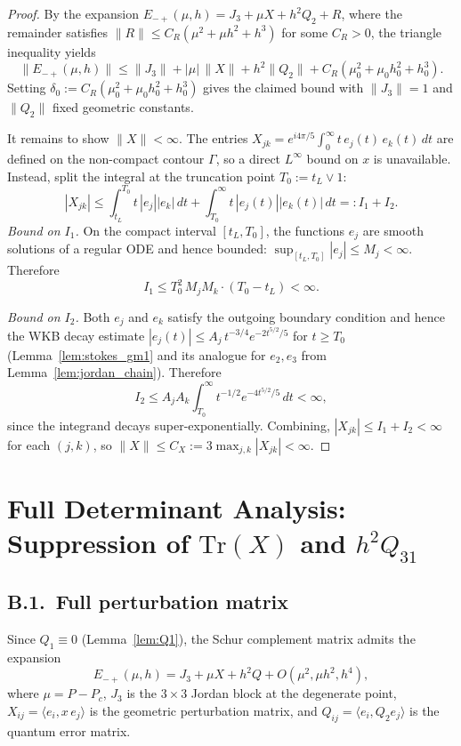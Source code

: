 \documentclass[12pt,a4paper]{amsart}
\theoremstyle{remark}
\begin{document}
\begin{proof}
By the expansion $E_{-+}(\mu,h) = J_3 + \mu X + h^2 Q_2 + R$, where the remainder
satisfies $\|R\| \leq C_R(\mu^2 + \mu h^2 + h^3)$ for some $C_R > 0$, the triangle
inequality yields
\[
  \|E_{-+}(\mu,h)\| \leq \|J_3\| + |\mu|\,\|X\| + h^2\|Q_2\| + C_R(\mu_0^2 + \mu_0 h_0^2 + h_0^3).
\]
Setting $\delta_0 := C_R(\mu_0^2 + \mu_0 h_0^2 + h_0^3)$ gives the claimed bound with
$\|J_3\| = 1$ and $\|Q_2\|$ fixed geometric constants.

It remains to show $\|X\| < \infty$.
The entries $X_{jk} = e^{i4\pi/5}\int_0^\infty t\,e_j(t)\,e_k(t)\,dt$
are defined on the non-compact contour $\Gamma$, so a direct $L^\infty$ bound on $x$
is unavailable.
Instead, split the integral at the truncation point $T_0 := t_L \vee 1$:
\[
  |X_{jk}|
  \leq \int_{t_L}^{T_0} t\,|e_j||e_k|\,dt
     + \int_{T_0}^\infty t\,|e_j(t)||e_k(t)|\,dt
  =: I_1 + I_2.
\]
\emph{Bound on $I_1$.}
On the compact interval $[t_L, T_0]$, the functions $e_j$ are smooth solutions
of a regular ODE and hence bounded: $\sup_{[t_L,T_0]}|e_j| \leq M_j < \infty$.
Therefore
\[
  I_1 \leq T_0^2\,M_j M_k \cdot (T_0 - t_L) < \infty.
\]

\emph{Bound on $I_2$.}
Both $e_j$ and $e_k$ satisfy the outgoing boundary condition and hence the
WKB decay estimate $|e_j(t)| \leq A_j\,t^{-3/4}e^{-2t^{5/2}/5}$ for $t \geq T_0$
(Lemma~\ref{lem:stokes_gm1} and its analogue for $e_2, e_3$ from
Lemma~\ref{lem:jordan_chain}). Therefore
\[
  I_2
  \leq A_j A_k \int_{T_0}^\infty t^{-1/2} e^{-4t^{5/2}/5}\,dt
  < \infty,
\]
since the integrand decays super-exponentially.
Combining, $|X_{jk}| \leq I_1 + I_2 < \infty$ for each $(j,k)$, so
$\|X\| \leq C_X := 3\max_{j,k}|X_{jk}| < \infty$.
\end{proof}


\section{Full Determinant Analysis: Suppression of $\mathrm{Tr}(X)$ and $h^2 Q_{31}$}
\label{app:B}

\subsection*{B.1.~Full perturbation matrix}

Since $Q_1 \equiv 0$ (Lemma~\ref{lem:Q1}), the Schur complement matrix admits the expansion
\[
  E_{-+}(\mu,h) = J_3 + \mu X + h^2 Q + O(\mu^2, \mu h^2, h^4),
\]
where $\mu = P - P_c$, $J_3$ is the $3\times 3$ Jordan block at the degenerate point,
$X_{ij} = \langle e_i, x\,e_j\rangle$ is the geometric perturbation matrix, and
$Q_{ij} = \langle e_i, Q_2 e_j\rangle$ is the quantum error matrix.
\end{document}
